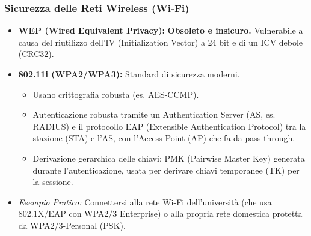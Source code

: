 \subsubsection{Sicurezza delle Reti Wireless (Wi-Fi)}
\begin{itemize}
    \item \textbf{WEP (Wired Equivalent Privacy):} \textbf{Obsoleto e insicuro.} Vulnerabile a causa del riutilizzo dell'IV (Initialization Vector) a 24 bit e di un ICV debole (CRC32).
    \item \textbf{802.11i (WPA2/WPA3):} Standard di sicurezza moderni.
    \begin{itemize}
        \item Usano crittografia robusta (es. AES-CCMP).
        \item Autenticazione robusta tramite un Authentication Server (AS, es. RADIUS) e il protocollo EAP (Extensible Authentication Protocol) tra la stazione (STA) e l'AS, con l'Access Point (AP) che fa da pass-through.
        \item Derivazione gerarchica delle chiavi: PMK (Pairwise Master Key) generata durante l'autenticazione, usata per derivare chiavi temporanee (TK) per la sessione.
    \end{itemize}
    \item \emph{Esempio Pratico:} Connettersi alla rete Wi-Fi dell'università (che usa 802.1X/EAP con WPA2/3 Enterprise) o alla propria rete domestica protetta da WPA2/3-Personal (PSK).
\end{itemize}

